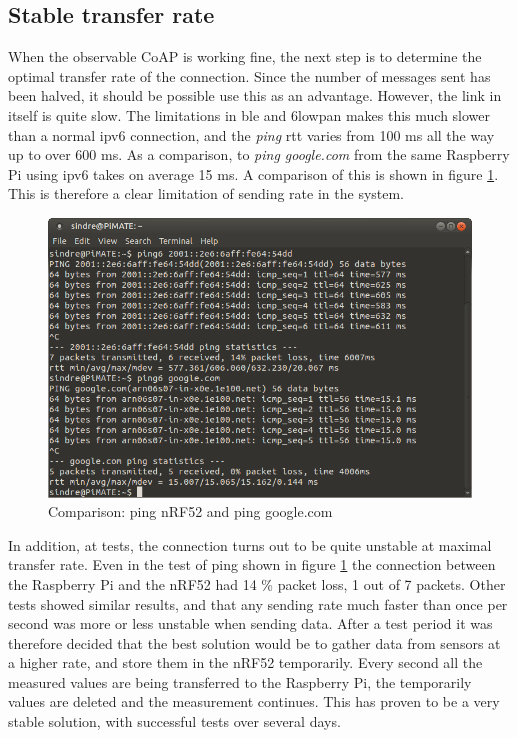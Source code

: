 \subsection{Stable transfer rate}

When the observable CoAP is working fine, the next step is to determine the optimal transfer rate of the connection. Since the number of messages sent has been halved, it should be possible use this as an advantage. However, the link in itself is quite slow. The limitations in \gls{ble} and \gls{6lowpan} makes this much slower than a normal \gls{ipv6} connection, and the \textit{ping} \gls{rtt} varies from 100 ms all the way up to over 600 ms. As a comparison, to \textit{ping google.com} from the same Raspberry Pi using \gls{ipv6} takes on average 15 ms. A comparison of this is shown in figure \ref{fig:pingComparison}. This is therefore a clear limitation of sending rate in the system. 

\begin{figure}[h]
    \centering
    \includegraphics[scale=0.5]{ping6test.png}    
    \caption{Comparison: ping nRF52 and ping google.com}
    \label{fig:pingComparison}
\end{figure}


In addition, at tests, the connection turns out to be quite unstable at maximal transfer rate. Even in the test of ping shown in figure \ref{fig:pingComparison} the connection between the Raspberry Pi and the nRF52 had 14 \% packet loss, 1 out of 7 packets. Other tests showed similar results, and that any sending rate much faster than once per second was more or less unstable when sending data. After a test period it was therefore decided that the best solution would be to gather data from sensors at a higher rate, and store them in the nRF52 temporarily. Every second all the measured values are being transferred to the Raspberry Pi, the temporarily values are deleted and the measurement continues. This has proven to be a very stable solution, with successful tests over several days. 


